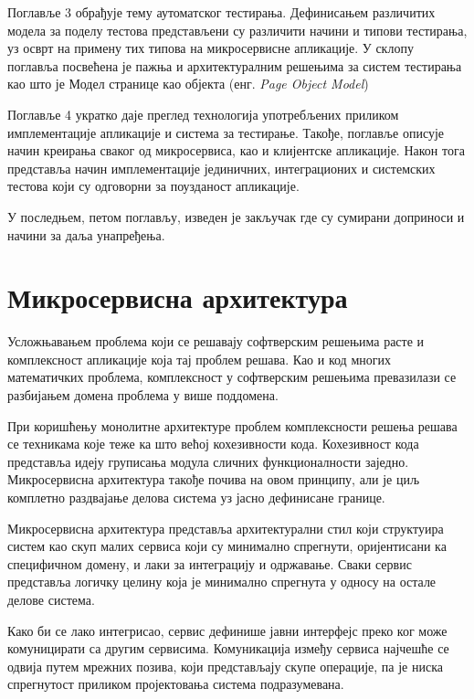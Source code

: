 \documentclass[12pt,oneside]{memoir}
\begin{document}
Поглавље 3 обрађује тему аутоматског тестирања. Дефинисањем различитих модела за поделу тестова представљени су различити начини и типови тестирања, уз осврт на примену тих типова на микросервисне апликације. У склопу поглавља посвећена је пажња и архитектуралним решењима за систем тестирања као што је Модел странице као објекта (енг. \textit{Page Object Model})

Поглавље 4 укратко даје преглед технологија употребљених приликом имплементације апликације и система за тестирање. Такође, поглавље описује начин креирања сваког од микросервиса, као и клијентске апликације. Након тога представља начин имплементације јединичних, интеграционих и системских тестова који су одговорни за поузданост апликације.

 У последњем, петом поглављу, изведен је закључак где су сумирани доприноси и начини за даља унапређења.



\chapter{Микросервисна архитектура}
\label{chp:mikroservisi}

Усложњавањем проблема који се решавају софтверским решењима расте и комплексност апликације која тај проблем решава. Као и код многих математичких проблема, комплексност у софтверским решењима превазилази се разбијањем домена проблема у више поддомена. 

При коришћењу монолитне архитектуре проблем комплексности решења решава се техникама које теже ка што већој кохезивности кода. Кохезивност кода представља идеју груписања модула сличних функционалности заједно. 
Микросервисна архитектура такође почива на овом принципу, али је циљ комплетно раздвајање делова система уз јасно дефинисане границе. 

Микросервисна архитектура представља архитектурални стил који структуира систем као скуп малих сервиса који су минимално спрегнути, оријентисани ка специфичном домену, и лаки за интеграцију и одржавање. Сваки сервис представља логичку целину која је минимално спрегнута у односу на остале делове система.

Како би се лако интегрисао, сервис дефинише јавни интерфејс преко ког може комуницирати са другим сервисима. Комуникација између сервиса најчешће се одвија путем мрежних позива, који представљају скупе операције, па је ниска спрегнутост приликом пројектовања система подразумевана. 
\end{document}
